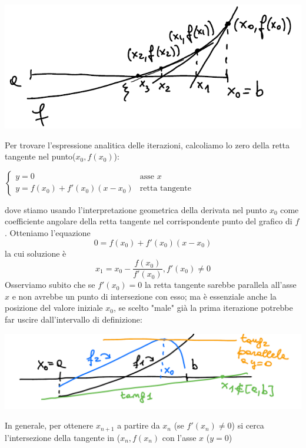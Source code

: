 \documentclass[12pt]{article}
\begin{document}
\begin{center}
    \includegraphics[scale=0.5]{pagina5_1.png}
\end{center}
Per trovare l'espressione analitica delle iterazioni, calcoliamo lo zero della retta tangente nel punto($x_0,f(x_0)$):
\begin{center}
    $\begin{cases}
        y = 0 &\mbox{asse } x\\
        y = f(x_0) + f'(x_0)(x-x_0) &\mbox{retta tangente}
    \end{cases}$
\end{center}
dove stiamo usando l'interpretazione geometrica della derivata nel punto $x_0$ come coefficiente angolare della retta tangente nel corrispondente punto del grafico di $f$. Otteniamo l'equazione 
\begin{equation*}
    0=f(x_0)+ f'(x_0)(x-x_0)
\end{equation*}
la cui soluzione è
\begin{equation*}
    x_1=x_0-\frac{f(x_0)}{f'(x_0)},f'(x_0)\neq 0
\end{equation*}
Osserviamo subito che se $f'(x_0)=0$ la retta tangente sarebbe parallela all'asse $x$ e non avrebbe un punto di intersezione con esso; ma è essenziale anche la posizione del valore iniziale $x_0$, se scelto "male" già la prima iterazione potrebbe far uscire dall'intervallo di definizione:\\
\begin{center}
    \includegraphics[scale=0.5]{pagina7.PNG}
\end{center}
In generale, per ottenere $x_{n+1}$ a partire da $x_n$ (se $f'(x_n)\neq 0$) si cerca l'intersezione della tangente in ($x_n,f(x_n)$ con l'asse $x$ ($y=0$)\\
\end{document}
